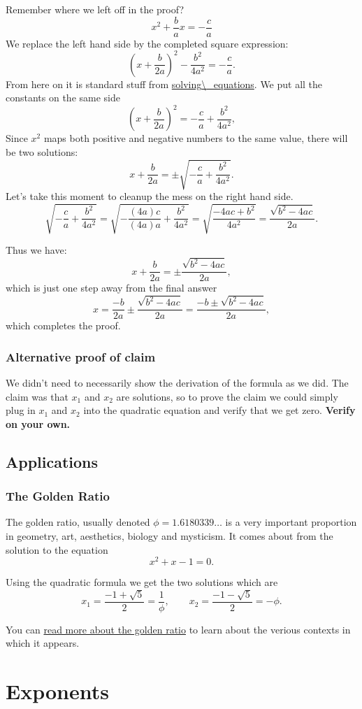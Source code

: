 \documentclass[twocolumn,8pt]{extarticle}
\newcommand{\dokutitleleveltwo}[1]{\section{#1}}
\newcommand{\dokutitleleveltree}[1]{\subsection{#1}}
\newcommand{\dokutitlelevelfour}[1]{\subsubsection{#1}}
\newcommand{\dokubold}[1]{\textbf{#1}}
\begin{document}
Remember where we left off in the proof?
\[
  x^2 + \frac{b}{a}x  = -\frac{c}{a}
\]
We replace the left hand side by the completed square expression:
\[
   \left(x + \frac{b}{2a} \right)^2 - \frac{b^2}{4a^2}  = -\frac{c}{a}.
\]
From here on it is standard stuff from \hyperref[de8b0e5156f4d2cb51a8bfd6e08459a0]{solving{\textbackslash}\_equations}.
We put all the constants on the same side
\[
   \left(x + \frac{b}{2a} \right)^2  = -\frac{c}{a} +  \frac{b^2}{4a^2}, 
\]
Since \(x^2\) maps both positive and negative numbers to the same value,
there will be two solutions:
\[
   x + \frac{b}{2a}  = \pm \sqrt{ -\frac{c}{a} +  \frac{b^2}{4a^2}  }.
\]
Let's take this moment to cleanup the mess on the right hand side.
\[
  \sqrt{ -\frac{c}{a} +  \frac{b^2}{4a^2}  } 
= \sqrt{ -\frac{(4a)c}{(4a)a} +  \frac{b^2}{4a^2}  }
= \sqrt{ \frac{- 4ac + b^2}{4a^2}  }
= \frac{\sqrt{b^2 -4ac}   }{ 2a   }.
\]

Thus we have:
\[
   x + \frac{b}{2a}  = \pm \frac{\sqrt{b^2 -4ac}   }{ 2a   },
\]
which is just one step away from the final answer
\[
   x  = \frac{-b}{2a}  \pm \frac{\sqrt{b^2 -4ac}   }{ 2a   } = \frac{-b \pm \sqrt{b^2 -4ac}   }{ 2a   },
\]
which completes the proof.


\dokutitlelevelfour{Alternative proof of claim}

We didn't need to necessarily show the derivation of the formula
as we did.  The claim was that \(x_1\) and \(x_2\) are solutions,
so to prove the claim we could simply plug in \(x_1\)
and \(x_2\) into the quadratic equation and verify that we get zero.
\dokubold{Verify on your own.}


\dokutitleleveltree{Applications}
\label{b5fba9ff24d0045d1377a05a46b32f68}%

\dokutitlelevelfour{The Golden Ratio}

The golden ratio, usually denoted \(\phi=1.6180339\ldots\)
is a very important  proportion in geometry, art, aesthetics, biology and mysticism. 
It comes about from the solution to the equation
\[
  x^2 +x -1 = 0.
\]

Using the quadratic formula we get the two solutions
which are
\[
   x_1 = \frac{-1+\sqrt{5}}{2} = \frac{1}{\phi}, \qquad x_2 = \frac{-1-\sqrt{5}}{2} = - \phi.
\]

You can \hyperref[d7bbf6d9d4bc796ac89630339c203241]{read more about the golden ratio} to learn
about the verious contexts in which it appears.




\dokutitleleveltwo{Exponents}
\label{2f711bc1acfc4fcc18827d8a2655a05f}%
\end{document}
